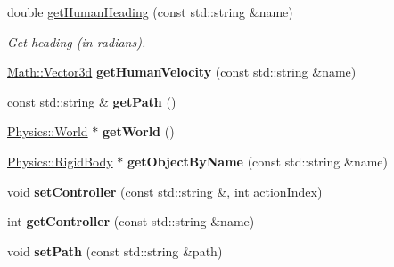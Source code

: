 \begin{DoxyCompactItemize}
\item 
\hypertarget{classCartWheel_1_1CartWheel3D_af6dcedbf7c948f2ccd12c33c1784df8a}{
double \hyperlink{classCartWheel_1_1CartWheel3D_af6dcedbf7c948f2ccd12c33c1784df8a}{getHumanHeading} (const std::string \&name)}
\label{classCartWheel_1_1CartWheel3D_af6dcedbf7c948f2ccd12c33c1784df8a}

\begin{DoxyCompactList}\small\item\em Get heading (in radians). \item\end{DoxyCompactList}\item 
\hypertarget{classCartWheel_1_1CartWheel3D_ab81bf4b2db2e6d52269131a6fa680adf}{
\hyperlink{classCartWheel_1_1Math_1_1Vector3d}{Math::Vector3d} {\bfseries getHumanVelocity} (const std::string \&name)}
\label{classCartWheel_1_1CartWheel3D_ab81bf4b2db2e6d52269131a6fa680adf}

\item 
\hypertarget{classCartWheel_1_1CartWheel3D_a9c93aeaf985abf2b3e63879f085e067b}{
const std::string \& {\bfseries getPath} ()}
\label{classCartWheel_1_1CartWheel3D_a9c93aeaf985abf2b3e63879f085e067b}

\item 
\hypertarget{classCartWheel_1_1CartWheel3D_add9d51b7e4c82ec1790b10f4428508d5}{
\hyperlink{classCartWheel_1_1Physics_1_1World}{Physics::World} $\ast$ {\bfseries getWorld} ()}
\label{classCartWheel_1_1CartWheel3D_add9d51b7e4c82ec1790b10f4428508d5}

\item 
\hypertarget{classCartWheel_1_1CartWheel3D_a2b023d8f52274d017916669bf0885e99}{
\hyperlink{classCartWheel_1_1Physics_1_1RigidBody}{Physics::RigidBody} $\ast$ {\bfseries getObjectByName} (const std::string \&name)}
\label{classCartWheel_1_1CartWheel3D_a2b023d8f52274d017916669bf0885e99}

\item 
\hypertarget{classCartWheel_1_1CartWheel3D_ab90d070fec7608900b5a68a207b5a288}{
void {\bfseries setController} (const std::string \&, int actionIndex)}
\label{classCartWheel_1_1CartWheel3D_ab90d070fec7608900b5a68a207b5a288}

\item 
\hypertarget{classCartWheel_1_1CartWheel3D_a08e7b15aec1185757afcdd328242024e}{
int {\bfseries getController} (const std::string \&name)}
\label{classCartWheel_1_1CartWheel3D_a08e7b15aec1185757afcdd328242024e}

\item 
\hypertarget{classCartWheel_1_1CartWheel3D_ad20e335f5514bb39f3633cec194a0173}{
void {\bfseries setPath} (const std::string \&path)}
\label{classCartWheel_1_1CartWheel3D_ad20e335f5514bb39f3633cec194a0173}


\end{DoxyCompactItemize}
